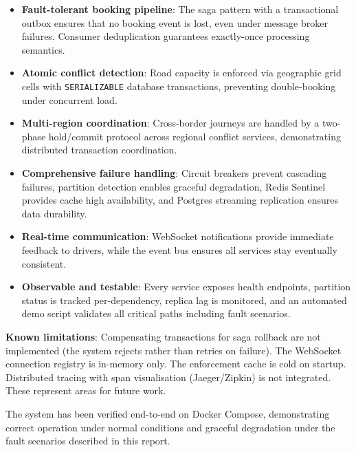 \documentclass[12pt,a4paper]{article}
\begin{document}
\begin{itemize}
  \item \textbf{Fault-tolerant booking pipeline}: The saga pattern with a transactional outbox ensures that no booking event is lost, even under message broker failures. Consumer deduplication guarantees exactly-once processing semantics.

  \item \textbf{Atomic conflict detection}: Road capacity is enforced via geographic grid cells with \texttt{SERIALIZABLE} database transactions, preventing double-booking under concurrent load.

  \item \textbf{Multi-region coordination}: Cross-border journeys are handled by a two-phase hold/commit protocol across regional conflict services, demonstrating distributed transaction coordination.

  \item \textbf{Comprehensive failure handling}: Circuit breakers prevent cascading failures, partition detection enables graceful degradation, Redis Sentinel provides cache high availability, and Postgres streaming replication ensures data durability.

  \item \textbf{Real-time communication}: WebSocket notifications provide immediate feedback to drivers, while the event bus ensures all services stay eventually consistent.

  \item \textbf{Observable and testable}: Every service exposes health endpoints, partition status is tracked per-dependency, replica lag is monitored, and an automated demo script validates all critical paths including fault scenarios.
\end{itemize}

\textbf{Known limitations}: Compensating transactions for saga rollback are not implemented (the system rejects rather than retries on failure). The WebSocket connection registry is in-memory only. The enforcement cache is cold on startup. Distributed tracing with span visualisation (Jaeger/Zipkin) is not integrated. These represent areas for future work.

The system has been verified end-to-end on Docker Compose, demonstrating correct operation under normal conditions and graceful degradation under the fault scenarios described in this report.
\end{document}
